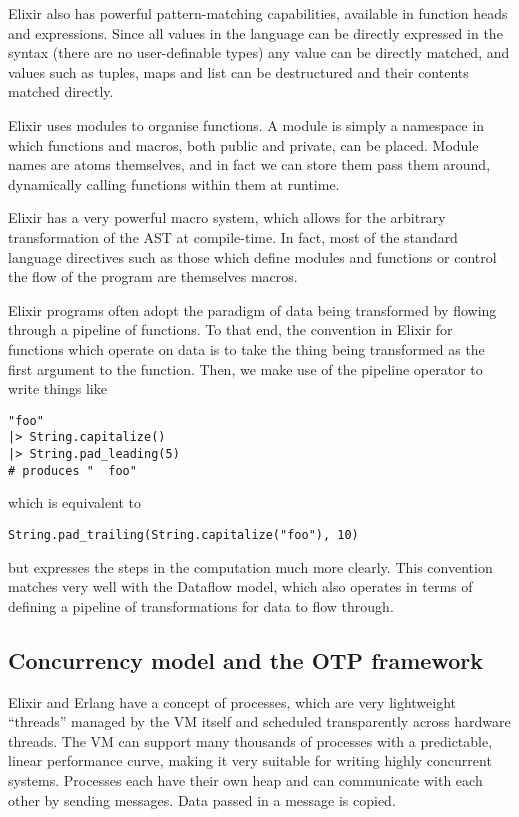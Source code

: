 Elixir also has powerful pattern-matching capabilities, available in function heads and  expressions.
Since all values in the language can be directly expressed in the syntax (there are no user-definable types) any value can be directly matched, and values such as tuples, maps and list can be destructured and their contents matched directly.

Elixir uses modules to organise functions.
A module is simply a namespace in which functions and macros, both public and private, can be placed.
Module names are atoms themselves, and in fact we can store them pass them around, dynamically calling functions within them at runtime.

Elixir has a very powerful macro system, which allows for the arbitrary transformation of the AST at compile-time.
In fact, most of the standard language directives such as those which define modules and functions or control the flow of the program are themselves macros.

Elixir programs often adopt the paradigm of data being transformed by flowing through a pipeline of functions.
To that end, the convention in Elixir for functions which operate on data is to take the thing being transformed as the first argument to the function.
Then, we make use of the pipeline operator \exs{|>} to write things like
\begin{verbatim}
"foo"
|> String.capitalize()
|> String.pad_leading(5)
# produces "  foo"
\end{verbatim}
which is equivalent to
\begin{verbatim}
String.pad_trailing(String.capitalize("foo"), 10)		
\end{verbatim}
but expresses the steps in the computation much more clearly.
This convention matches very well with the Dataflow model, which also operates in terms of defining a pipeline of transformations for data to flow through.

\subsection{Concurrency model and the OTP framework}

Elixir and Erlang have a concept of processes, which are very lightweight ``threads'' managed by the VM itself and scheduled transparently across hardware threads.
The VM can support many thousands of processes with a predictable, linear performance curve, making it very suitable for writing highly concurrent systems.
Processes each have their own heap and can communicate with each other by sending messages.
Data passed in a message is copied.

